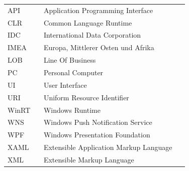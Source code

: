 \documentclass[a4paper,bibtotoc,oneside]{scrbook}
\begin{document}

\listoffigures
{} %
\newpage

 \lstlistoflistings
{} %
\newpage

\listoftables 
{} %
\newpage

\hspace{-17mm}\begin{tabular}{>{\raggedleft}p{0.2\linewidth} p{0.75\linewidth} p{0.1\linewidth}}
API & Application Programming Interface \\
CLR & Common Language Runtime \\
IDC & International Data Corporation \\
IMEA & Europa, Mittlerer Osten und Afrika \\
LOB & Line Of Business \\
PC & Personal Computer \\
UI & User Interface \\
URI & Uniform Resource Identifier \\
WinRT & Windows Runtime \\
WNS &  Windows Push Notification Service \\
WPF & Windows Presentation Foundation \\
XAML & Extensible Application Markup Language \\
XML & Extensible Markup Language
\end{tabular}
\end{document}
